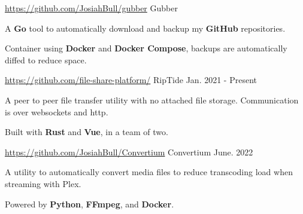 
\begin{cventries}
  \cventry
    {\href{https://github.com/JosiahBull/gubber}{\faLink \space https://github.com/JosiahBull/gubber}}
    {Gubber}
    {}
    {} %
    {
      \begin{cvitems}
        \item {A \textbf{Go} tool to automatically download and backup my \textbf{GitHub} repositories.}
        \item {Container using \textbf{Docker} and \textbf{Docker Compose}, backups are automatically diffed to reduce space.}
      \end{cvitems}
    }

  \cventry
    {\href{https://github.com/file-share-platform}{\faLink \space https://github.com/file-share-platform/}} %
    {RipTide} %
    {} %
    {Jan. 2021 - Present} %
    {
      \begin{cvitems} %
        \item {A peer to peer file transfer utility with no attached file storage. Communication is over websockets and http.}
        \item {Built with \textbf{Rust} and \textbf{Vue}, in a team of two.}
      \end{cvitems}
    }

  \cventry
  {\href{https://github.com/JosiahBull/Convertium}{\faLink \space https://github.com/JosiahBull/Convertium}} %
  {Convertium} %
  {} %
  {June. 2022} %
  {
    \begin{cvitems} %
      \item {A utility to automatically convert media files to reduce transcoding load when streaming with Plex.}
      \item {Powered by \textbf{Python}, \textbf{FFmpeg}, and \textbf{Docker}.}
    \end{cvitems}
  }


\end{cventries}

